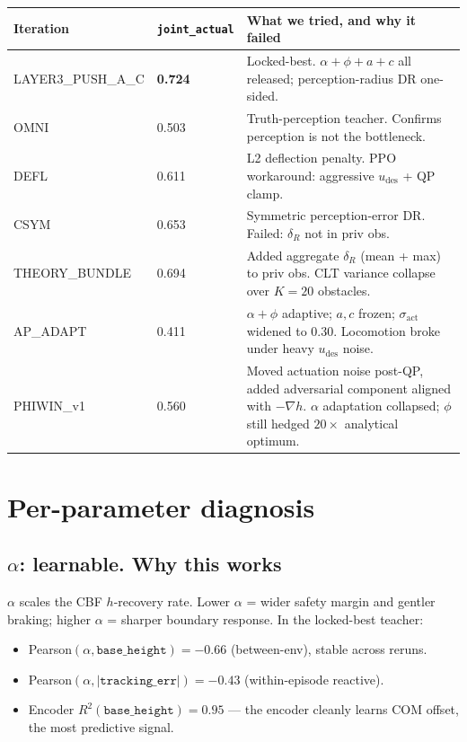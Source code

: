 \documentclass[11pt]{article}
\begin{document}
\begin{center}
\begin{tabular}{@{}l l p{2.6in}@{}}
\toprule
Iteration & \texttt{joint\_actual} & What we tried, and why it failed \\
\midrule
LAYER3\_PUSH\_A\_C & \textbf{0.724} & Locked-best. $\alpha + \phi + a + c$ all released; perception-radius DR one-sided. \\
OMNI               & 0.503 & Truth-perception teacher. Confirms perception is not the bottleneck. \\
DEFL               & 0.611 & L2 deflection penalty. PPO workaround: aggressive $u_\text{des}$ + QP clamp. \\
CSYM               & 0.653 & Symmetric perception-error DR. Failed: $\delta_R$ not in priv obs. \\
THEORY\_BUNDLE     & 0.694 & Added aggregate $\delta_R$ (mean + max) to priv obs. CLT variance collapse over $K=20$ obstacles. \\
AP\_ADAPT          & 0.411 & $\alpha + \phi$ adaptive; $a, c$ frozen; $\sigma_\text{act}$ widened to 0.30. Locomotion broke under heavy $u_\text{des}$ noise. \\
PHIWIN\_v1         & 0.560 & Moved actuation noise post-QP, added adversarial component aligned with $-\nabla h$. $\alpha$ adaptation collapsed; $\phi$ still hedged $20\times$ analytical optimum. \\
\bottomrule
\end{tabular}
\end{center}

\section*{Per-parameter diagnosis}

\subsection*{$\alpha$: learnable. Why this works}

$\alpha$ scales the CBF $h$-recovery rate. Lower $\alpha$ = wider safety margin and gentler braking; higher $\alpha$ = sharper boundary response. In the locked-best teacher:

\begin{itemize}
\item Pearson$(\alpha, \texttt{base\_height}) = -0.66$ (between-env), stable across reruns.
\item Pearson$(\alpha, |\texttt{tracking\_err}|) = -0.43$ (within-episode reactive).
\item Encoder $R^2(\texttt{base\_height}) = 0.95$ --- the encoder cleanly learns COM offset, the most predictive signal.
\end{itemize}
\end{document}
